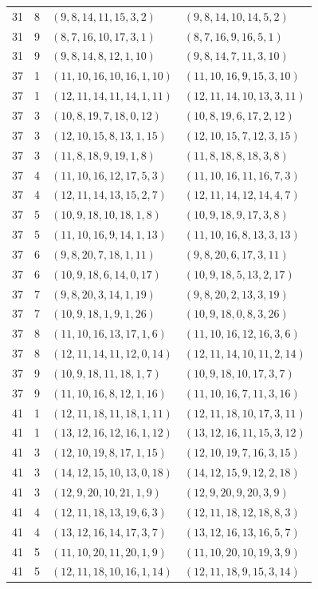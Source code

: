 \begin{longtable}{rrll}
31&8&$(9,8,14,11,15,3,2)$&$(9,8,14,10,14,5,2)$\\
31&9&$(8,7,16,10,17,3,1)$&$(8,7,16,9,16,5,1)$\\
31&9&$(9,8,14,8,12,1,10)$&$(9,8,14,7,11,3,10)$\\
37&1&$(11,10,16,10,16,1,10)$&$(11,10,16,9,15,3,10)$\\
37&1&$(12,11,14,11,14,1,11)$&$(12,11,14,10,13,3,11)$\\
37&3&$(10,8,19,7,18,0,12)$&$(10,8,19,6,17,2,12)$\\
37&3&$(12,10,15,8,13,1,15)$&$(12,10,15,7,12,3,15)$\\
37&3&$(11,8,18,9,19,1,8)$&$(11,8,18,8,18,3,8)$\\
37&4&$(11,10,16,12,17,5,3)$&$(11,10,16,11,16,7,3)$\\
37&4&$(12,11,14,13,15,2,7)$&$(12,11,14,12,14,4,7)$\\
37&5&$(10,9,18,10,18,1,8)$&$(10,9,18,9,17,3,8)$\\
37&5&$(11,10,16,9,14,1,13)$&$(11,10,16,8,13,3,13)$\\
37&6&$(9,8,20,7,18,1,11)$&$(9,8,20,6,17,3,11)$\\
37&6&$(10,9,18,6,14,0,17)$&$(10,9,18,5,13,2,17)$\\
37&7&$(9,8,20,3,14,1,19)$&$(9,8,20,2,13,3,19)$\\
37&7&$(10,9,18,1,9,1,26)$&$(10,9,18,0,8,3,26)$\\
37&8&$(11,10,16,13,17,1,6)$&$(11,10,16,12,16,3,6)$\\
37&8&$(12,11,14,11,12,0,14)$&$(12,11,14,10,11,2,14)$\\
37&9&$(10,9,18,11,18,1,7)$&$(10,9,18,10,17,3,7)$\\
37&9&$(11,10,16,8,12,1,16)$&$(11,10,16,7,11,3,16)$\\
41&1&$(12,11,18,11,18,1,11)$&$(12,11,18,10,17,3,11)$\\
41&1&$(13,12,16,12,16,1,12)$&$(13,12,16,11,15,3,12)$\\
41&3&$(12,10,19,8,17,1,15)$&$(12,10,19,7,16,3,15)$\\
41&3&$(14,12,15,10,13,0,18)$&$(14,12,15,9,12,2,18)$\\
41&3&$(12,9,20,10,21,1,9)$&$(12,9,20,9,20,3,9)$\\
41&4&$(12,11,18,13,19,6,3)$&$(12,11,18,12,18,8,3)$\\
41&4&$(13,12,16,14,17,3,7)$&$(13,12,16,13,16,5,7)$\\
41&5&$(11,10,20,11,20,1,9)$&$(11,10,20,10,19,3,9)$\\
41&5&$(12,11,18,10,16,1,14)$&$(12,11,18,9,15,3,14)$\\

\end{longtable}

